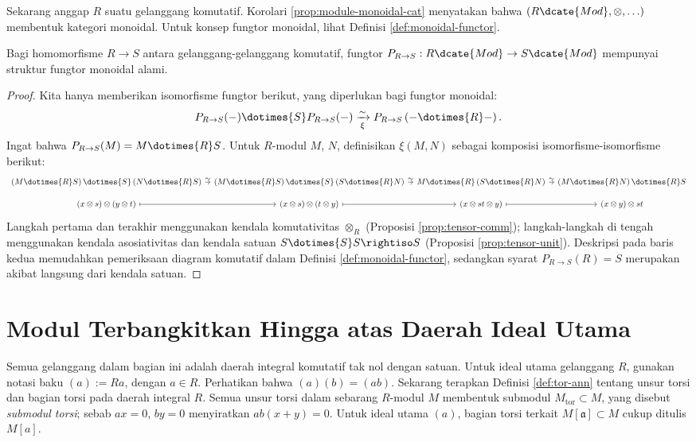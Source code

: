 Sekarang anggap $R$ suatu gelanggang komutatif. Korolari \ref{prop:module-monoidal-cat} menyatakan bahwa $(R\dcate{Mod}, \otimes, \ldots)$ membentuk kategori monoidal. Untuk konsep fungtor monoidal, lihat Definisi \ref{def:monoidal-functor}.
\begin{proposition}
	Bagi homomorfisme $R \to S$ antara gelanggang-gelanggang komutatif, fungtor $P_{R \to S}: R\dcate{Mod} \to S\dcate{Mod}$ mempunyai struktur fungtor monoidal alami.
\end{proposition}
\begin{proof}
	Kita hanya memberikan isomorfisme fungtor berikut, yang diperlukan bagi fungtor monoidal: \[P_{R \to S}(-) \dotimes{S} P_{R \to S}(-) \xrightarrow[\xi]{\sim} P_{R \to S}\left( - \dotimes{R} - \right).\] Ingat bahwa $P_{R \to S}(M) = M \dotimes{R} S$. Untuk $R$-modul $M$, $N$, definisikan $\xi(M,N)$ sebagai komposisi isomorfisme-isomorfisme berikut:
	\[\begin{tikzcd}[row sep=small, column sep=tiny, every cell/.style={scale=0.93, transform shape, inner xsep=1ex, inner ysep=0.85ex}]
		\left( M \dotimes{R} S \right) \dotimes{S} \left( N \dotimes{R} S \right) \arrow[r, "\sim"] & \left( M \dotimes{R} S \right) \dotimes{S} \left( S \dotimes{R} N \right) \arrow[r, "\sim"] & M \dotimes{R} \left( S \dotimes{R} N \right) \arrow[r, "\sim"] & \left( M \dotimes{R} N \right) \dotimes{R} S \\
		(x \otimes s) \otimes (y \otimes t) \arrow[mapsto, r] & (x \otimes s) \otimes (t \otimes y) \arrow[mapsto, r] & (x \otimes st \otimes y) \arrow[mapsto, r] & (x \otimes y) \otimes st
	\end{tikzcd}\]
	Langkah pertama dan terakhir menggunakan kendala komutativitas $\otimes_R$ (Proposisi \ref{prop:tensor-comm}); langkah-langkah di tengah menggunakan kendala asosiativitas dan kendala satuan $S \dotimes{S} S \rightiso S$ (Proposisi \ref{prop:tensor-unit}). Deskripsi pada baris kedua memudahkan pemeriksaan diagram komutatif dalam Definisi \ref{def:monoidal-functor}, sedangkan syarat $P_{R \to S}(R) = S$ merupakan akibat langsung dari kendala satuan.
\end{proof}
 
\section{Modul Terbangkitkan Hingga atas Daerah Ideal Utama}\label{sec:PID-module}
Semua gelanggang dalam bagian ini adalah daerah integral komutatif tak nol dengan satuan. Untuk ideal utama gelanggang $R$, gunakan notasi baku $(a) := Ra$, dengan $a \in R$. Perhatikan bahwa $(a)(b) = (ab)$. Sekarang terapkan Definisi \ref{def:tor-ann} tentang unsur torsi dan bagian torsi pada daerah integral $R$. Semua unsur torsi dalam sebarang $R$-modul $M$ membentuk submodul $M_\text{tor} \subset M$, yang disebut \emph{submodul torsi}; sebab $ax=0$, $by=0$ menyiratkan $ab(x+y)=0$. Untuk ideal utama $(a)$, bagian torsi terkait $M[\mathfrak{a}] \subset M$ cukup ditulis $M[a]$.

